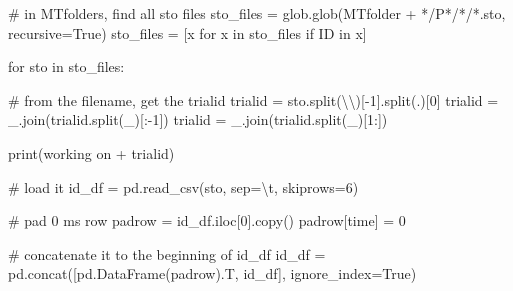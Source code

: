 \documentclass[
  letterpaper,
  DIV=11,
  numbers=noendperiod]{scrreprt}
\newenvironment{Shaded}{\begin{snugshade}}{\end{snugshade}}
\newcommand{\BuiltInTok}[1]{\textcolor[rgb]{0.00,0.23,0.31}{#1}}
\newcommand{\CharTok}[1]{\textcolor[rgb]{0.13,0.47,0.30}{#1}}
\newcommand{\CommentTok}[1]{\textcolor[rgb]{0.37,0.37,0.37}{#1}}
\newcommand{\ControlFlowTok}[1]{\textcolor[rgb]{0.00,0.23,0.31}{#1}}
\newcommand{\DecValTok}[1]{\textcolor[rgb]{0.68,0.00,0.00}{#1}}
\newcommand{\KeywordTok}[1]{\textcolor[rgb]{0.00,0.23,0.31}{#1}}
\newcommand{\NormalTok}[1]{\textcolor[rgb]{0.00,0.23,0.31}{#1}}
\newcommand{\OperatorTok}[1]{\textcolor[rgb]{0.37,0.37,0.37}{#1}}
\newcommand{\StringTok}[1]{\textcolor[rgb]{0.13,0.47,0.30}{#1}}
\newcommand{\VariableTok}[1]{\textcolor[rgb]{0.07,0.07,0.07}{#1}}
\begin{document}
\begin{Shaded}
\begin{Highlighting}[]
\CommentTok{\# in MTfolders, find all sto files}
\NormalTok{sto\_files }\OperatorTok{=}\NormalTok{ glob.glob(MTfolder }\OperatorTok{+} \StringTok{\textquotesingle{}*/P*/*/*.sto\textquotesingle{}}\NormalTok{, recursive}\OperatorTok{=}\VariableTok{True}\NormalTok{)}
\NormalTok{sto\_files }\OperatorTok{=}\NormalTok{ [x }\ControlFlowTok{for}\NormalTok{ x }\KeywordTok{in}\NormalTok{ sto\_files }\ControlFlowTok{if} \StringTok{\textquotesingle{}ID\textquotesingle{}} \KeywordTok{in}\NormalTok{ x]}

\ControlFlowTok{for}\NormalTok{ sto }\KeywordTok{in}\NormalTok{ sto\_files:}

    \CommentTok{\# from the filename, get the trialid}
\NormalTok{    trialid }\OperatorTok{=}\NormalTok{ sto.split(}\StringTok{\textquotesingle{}}\CharTok{\textbackslash{}\textbackslash{}}\StringTok{\textquotesingle{}}\NormalTok{)[}\OperatorTok{{-}}\DecValTok{1}\NormalTok{].split(}\StringTok{\textquotesingle{}.\textquotesingle{}}\NormalTok{)[}\DecValTok{0}\NormalTok{]}
\NormalTok{    trialid }\OperatorTok{=} \StringTok{\textquotesingle{}\_\textquotesingle{}}\NormalTok{.join(trialid.split(}\StringTok{\textquotesingle{}\_\textquotesingle{}}\NormalTok{)[:}\OperatorTok{{-}}\DecValTok{1}\NormalTok{])}
\NormalTok{    trialid }\OperatorTok{=} \StringTok{\textquotesingle{}\_\textquotesingle{}}\NormalTok{.join(trialid.split(}\StringTok{\textquotesingle{}\_\textquotesingle{}}\NormalTok{)[}\DecValTok{1}\NormalTok{:])}

    \BuiltInTok{print}\NormalTok{(}\StringTok{\textquotesingle{}working on \textquotesingle{}} \OperatorTok{+}\NormalTok{ trialid)}

    \CommentTok{\# load it}
\NormalTok{    id\_df }\OperatorTok{=}\NormalTok{ pd.read\_csv(sto, sep}\OperatorTok{=}\StringTok{\textquotesingle{}}\CharTok{\textbackslash{}t}\StringTok{\textquotesingle{}}\NormalTok{, skiprows}\OperatorTok{=}\DecValTok{6}\NormalTok{)}

    \CommentTok{\# pad 0 ms row}
\NormalTok{    padrow }\OperatorTok{=}\NormalTok{ id\_df.iloc[}\DecValTok{0}\NormalTok{].copy()}
\NormalTok{    padrow[}\StringTok{\textquotesingle{}time\textquotesingle{}}\NormalTok{] }\OperatorTok{=} \DecValTok{0}

    \CommentTok{\# concatenate it to the beginning of id\_df}
\NormalTok{    id\_df }\OperatorTok{=}\NormalTok{ pd.concat([pd.DataFrame(padrow).T, id\_df], ignore\_index}\OperatorTok{=}\VariableTok{True}\NormalTok{)}


\end{Highlighting}
\end{Shaded}
\end{document}

